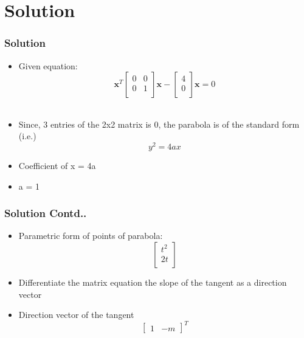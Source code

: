 \documentclass[12pt]{beamer}
\begin{document}
\section{Solution}

\begin{frame}
\frametitle{Solution}
\begin{itemize}
\item<1-4> Given equation:
\[
\textbf{x}^T
\begin{bmatrix}
    0 & 0\\
    0 & 1\\  
\end{bmatrix}
\textbf{x}  -  
\begin{bmatrix}
    4\\
    0\\  
\end{bmatrix}
\textbf{x} = 0
\] \\
\item<2-4> Since, 3 entries of the 2x2 matrix is 0, the parabola is of the standard form (i.e.) \[ y^2 = 4ax\]
\item<3-4> Coefficient of x = 4a
\item<4> a = 1
\end{itemize}
\end{frame}


\begin{frame}
\frametitle{Solution Contd..}
\begin{itemize}
\item<1-3> Parametric form of points of parabola: 
\[
\begin{bmatrix}
    t^2\\
    2t\\  
\end{bmatrix}
\]
\item<2-3> Differentiate the matrix equation the slope of the tangent as a direction vector
\item<3> Direction vector of the tangent
\[
\begin{bmatrix}
    1 & -m
\end{bmatrix}^T
\]
\end{itemize}
\end{frame}

\end{document}

